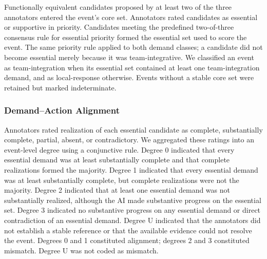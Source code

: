 \documentclass[manuscript,review,anonymous]{acmart}
\begin{document}
Functionally equivalent candidates proposed by at least two of the three annotators entered the event's core set. Annotators rated candidates as essential or supportive in priority. Candidates meeting the predefined two-of-three consensus rule for essential priority formed the essential set used to score the event. The same priority rule applied to both demand classes; a candidate did not become essential merely because it was team-integrative. We classified an event as team-integration when its essential set contained at least one team-integration demand, and as local-response otherwise. Events without a stable core set were retained but marked indeterminate.

\subsubsection{Demand--Action Alignment}

Annotators rated realization of each essential candidate as complete, substantially complete, partial, absent, or contradictory. We aggregated these ratings into an event-level degree using a conjunctive rule. Degree 0 indicated that every essential demand was at least substantially complete and that complete realizations formed the majority. Degree 1 indicated that every essential demand was at least substantially complete, but complete realizations were not the majority. Degree 2 indicated that at least one essential demand was not substantially realized, although the AI made substantive progress on the essential set. Degree 3 indicated no substantive progress on any essential demand or direct contradiction of an essential demand. Degree U indicated that the annotators did not establish a stable reference or that the available evidence could not resolve the event. Degrees 0 and 1 constituted alignment; degrees 2 and 3 constituted mismatch. Degree U was not coded as mismatch.
\end{document}
